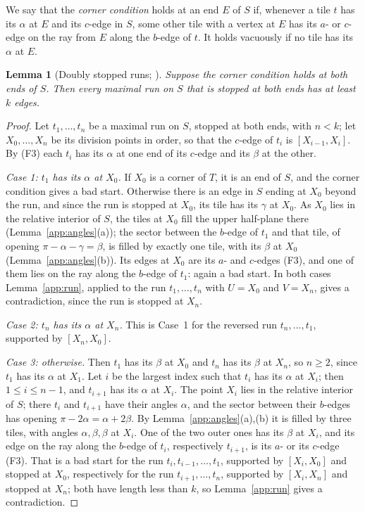 \documentclass[11pt]{amsart}
\newtheorem{lemma}[theorem]{Lemma}
\theoremstyle{remark}
\begin{document}
We say that the \emph{corner condition} holds at an end $E$ of $S$ if, whenever a tile $t$ has its $\alpha$ at $E$ and its $c$-edge in $S$, some other tile with a vertex at $E$ has its $a$- or $c$-edge on the ray from $E$ along the $b$-edge of $t$. It holds vacuously if no tile has its $\alpha$ at $E$.

\begin{lemma}[Doubly stopped runs; {\cite[Lemma~34]{BR}}]\label{app:dsr}
Suppose the corner condition holds at both ends of $S$. Then every maximal run on $S$ that is stopped at both ends has at least $k$ edges.
\end{lemma}

\begin{proof}
Let $t_1,\dots,t_n$ be a maximal run on $S$, stopped at both ends, with $n<k$; let $X_0,\dots,X_n$ be its division points in order, so that the $c$-edge of $t_i$ is $[X_{i-1},X_i]$. By (F3) each $t_i$ has its $\alpha$ at one end of its $c$-edge and its $\beta$ at the other.

\emph{Case 1: $t_1$ has its $\alpha$ at $X_0$.} If $X_0$ is a corner of $T$, it is an end of $S$, and the corner condition gives a bad start. Otherwise there is an edge in $S$ ending at $X_0$ beyond the run, and since the run is stopped at $X_0$, its tile has its $\gamma$ at $X_0$. As $X_0$ lies in the relative interior of $S$, the tiles at $X_0$ fill the upper half-plane there (Lemma~\ref{app:angles}(a)); the sector between the $b$-edge of $t_1$ and that tile, of opening $\pi-\alpha-\gamma=\beta$, is filled by exactly one tile, with its $\beta$ at $X_0$ (Lemma~\ref{app:angles}(b)). Its edges at $X_0$ are its $a$- and $c$-edges (F3), and one of them lies on the ray along the $b$-edge of $t_1$: again a bad start. In both cases Lemma~\ref{app:run}, applied to the run $t_1,\dots,t_n$ with $U=X_0$ and $V=X_n$, gives a contradiction, since the run is stopped at $X_n$.

\emph{Case 2: $t_n$ has its $\alpha$ at $X_n$.} This is Case~1 for the reversed run $t_n,\dots,t_1$, supported by $[X_n,X_0]$.

\emph{Case 3: otherwise.} Then $t_1$ has its $\beta$ at $X_0$ and $t_n$ has its $\beta$ at $X_n$, so $n\ge2$, since $t_1$ has its $\alpha$ at $X_1$. Let $i$ be the largest index such that $t_i$ has its $\alpha$ at $X_i$; then $1\le i\le n-1$, and $t_{i+1}$ has its $\alpha$ at $X_i$. The point $X_i$ lies in the relative interior of $S$; there $t_i$ and $t_{i+1}$ have their angles $\alpha$, and the sector between their $b$-edges has opening $\pi-2\alpha=\alpha+2\beta$. By Lemma~\ref{app:angles}(a),(b) it is filled by three tiles, with angles $\alpha,\beta,\beta$ at $X_i$. One of the two outer ones has its $\beta$ at $X_i$, and its edge on the ray along the $b$-edge of $t_i$, respectively $t_{i+1}$, is its $a$- or its $c$-edge (F3). That is a bad start for the run $t_i,t_{i-1},\dots,t_1$, supported by $[X_i,X_0]$ and stopped at $X_0$, respectively for the run $t_{i+1},\dots,t_n$, supported by $[X_i,X_n]$ and stopped at $X_n$; both have length less than $k$, so Lemma~\ref{app:run} gives a contradiction.
\end{proof}
\end{document}
